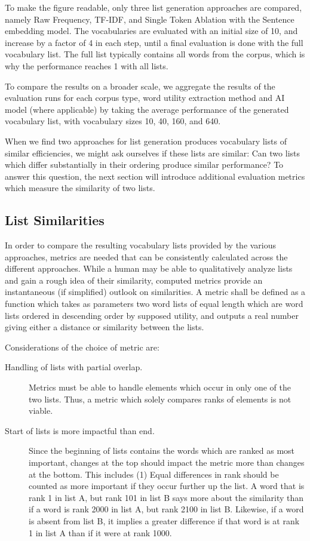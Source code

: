 To make the figure readable, only three list generation approaches are compared, namely Raw Frequency, TF-IDF, and Single Token Ablation with the Sentence embedding model.
The vocabularies are evaluated with an initial size of 10, and increase by a factor of 4 in each step, until a final evaluation is done with the full vocabulary list.
The full list typically contains all words from the corpus, which is why the performance reaches 1 with all lists.

To compare the results on a broader scale, we aggregate the results of the evaluation runs for each corpus type, word utility extraction method and AI model (where applicable) by taking the average performance of the generated vocabulary list, with vocabulary sizes 10, 40, 160, and 640.


When we find two approaches for list generation produces vocabulary lists of similar efficiencies, we might ask ourselves if these lists are similar:
Can two lists which differ substantially in their ordering produce similar performance?
To answer this question, the next section will introduce additional evaluation metrics which measure the similarity of two lists.

\subsection{List Similarities}
In order to compare the resulting vocabulary lists provided by the various approaches, metrics are needed that can be consistently calculated across the different approaches.
While a human may be able to qualitatively analyze lists and gain a rough idea of their similarity, computed metrics provide an instantaneous (if simplified) outlook on similarities.
A metric shall be defined as a function which takes as parameters two word lists of equal length which are word lists ordered in descending order by supposed utility, and outputs a real number giving either a distance or similarity between the lists.

Considerations of the choice of metric are:

\begin{description}
	\item [Handling of lists with partial overlap.]
	      Metrics must be able to handle elements which occur in only one of the two lists.
	      Thus, a metric which solely compares ranks of elements is not viable.
	\item [Start of lists is more impactful than end.]
	      Since the beginning of lists contains the words which are ranked as most important, changes at the top should impact the metric more than changes at the bottom. This includes (1) Equal differences in rank should be counted as more important if they occur further up the list.
	      A word that is rank 1 in list A, but rank 101 in list B says more about the similarity than if a word is rank 2000 in list A, but rank 2100 in list B. Likewise, if a word is absent from list B, it implies a greater difference if that word is at rank 1 in list A than if it were at rank 1000.
\end{description}

